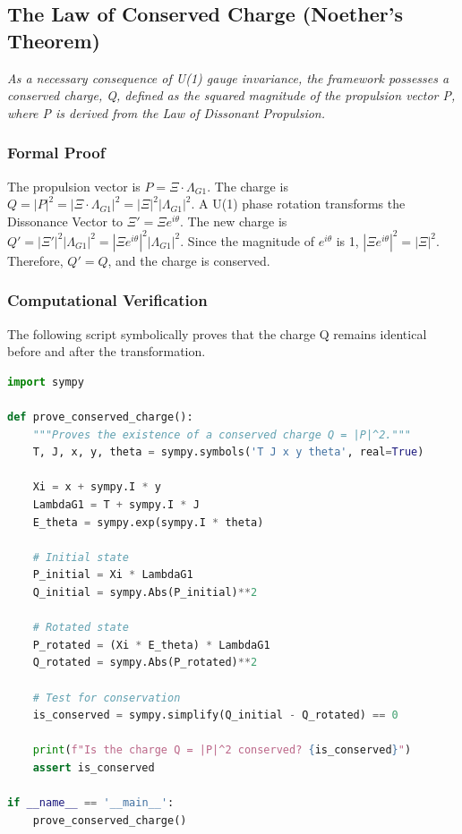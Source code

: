 \subsection{The Law of Conserved Charge (Noether's Theorem)}
\textit{As a necessary consequence of U(1) gauge invariance, the framework possesses a conserved charge, Q, defined as the squared magnitude of the propulsion vector P, where P is derived from the Law of Dissonant Propulsion.}

\subsubsection*{Formal Proof}
The propulsion vector is $P = \Xi \cdot \Lambda_{G1}$. The charge is $Q = |P|^2 = |\Xi \cdot \Lambda_{G1}|^2 = |\Xi|^2 |\Lambda_{G1}|^2$. A U(1) phase rotation transforms the Dissonance Vector to $\Xi' = \Xi e^{i\theta}$. The new charge is $Q' = |\Xi'|^2 |\Lambda_{G1}|^2 = |\Xi e^{i\theta}|^2 |\Lambda_{G1}|^2$. Since the magnitude of $e^{i\theta}$ is 1, $|\Xi e^{i\theta}|^2 = |\Xi|^2$. Therefore, $Q' = Q$, and the charge is conserved.

\subsubsection*{Computational Verification}
The following script symbolically proves that the charge Q remains identical before and after the transformation.
\begin{lstlisting}[language=Python, caption={Symbolic proof of a conserved Noether charge.}]
import sympy

def prove_conserved_charge():
    """Proves the existence of a conserved charge Q = |P|^2."""
    T, J, x, y, theta = sympy.symbols('T J x y theta', real=True)
    
    Xi = x + sympy.I * y
    LambdaG1 = T + sympy.I * J
    E_theta = sympy.exp(sympy.I * theta)
    
    # Initial state
    P_initial = Xi * LambdaG1
    Q_initial = sympy.Abs(P_initial)**2
    
    # Rotated state
    P_rotated = (Xi * E_theta) * LambdaG1
    Q_rotated = sympy.Abs(P_rotated)**2
    
    # Test for conservation
    is_conserved = sympy.simplify(Q_initial - Q_rotated) == 0
    
    print(f"Is the charge Q = |P|^2 conserved? {is_conserved}")
    assert is_conserved

if __name__ == '__main__':
    prove_conserved_charge()
\end{lstlisting}
